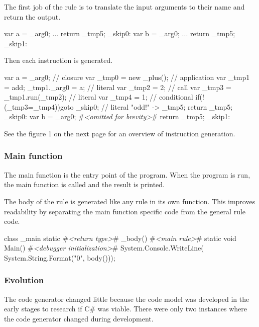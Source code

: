 The first job of the rule is to translate the input arguments to their name and return the output.

\begin{CS}
    {
        var a = _arg0; 
        ...
        return _tmp5;
    }
    _skip0:
    {
        var b = _arg0;
        ...
        return _tmp5;
    }
    _skip1:
\end{CS}

Then each instruction is generated.

\begin{CS}[escapeinside=\#\#]
    {
        var a = _arg0; 
        // closure
        var _tmp0 = new _plus(); 
        // application
        var _tmp1 = add;
        _tmp1._arg0 = a;
        // literal
        var _tmp2 = 2;
        // call
        var _tmp3 = _tmp1.run(_tmp2);
        // literal     
        var _tmp4 = 1;
        // conditional
        if(!(_tmp3=_tmp4)){goto _skip0;}
        // literal
        "odd!" -> _tmp5;
        return _tmp5;
    }
    _skip0:
    {
        var b = _arg0;
        #\textit{<omitted for brevity>}#
        return _tmp5;
    }
    _skip1:
\end{CS}

See the figure 1 on the next page for an overview of instruction generation.

\subsubsection{Main function}
The main function is the entry point of the program.
When the program is run, the main function is called and the result is printed.

The body of the rule is generated like any rule in its own function.
This improves readability by separating the main function specific code from the general rule code.

\begin{CS}[escapeinside=\#\#]
class _main{
    static #\textit{<return type>}# _body(){
        #\textit{<main rule>}#
    }
    static void Main(){
        #\textit{<debugger initialization>}#
        System.Console.WriteLine(
            System.String.Format("{0}", 
                                 body()));
    }
}
\end{CS}


\subsubsection{Evolution}
The code generator changed little because the code model was developed in the early stages to research if C\# was viable.
There were only two instances where the code generator changed during development.

